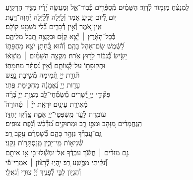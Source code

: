 \documentclass[twoside, openany, parskip=half, 11pt]{book}
\begin{document}
\begin{narrow}
לַמְנַצֵּ֗חַ מִזְמ֥וֹר לְ֯דָוִֽד׃ \hfill \break
הַשָּׁמַ֗יִם מְֽ֯סַפְּ֯רִ֥ים כְּ֯בֽוֹד־אֵ֑ל \hfill וּֽמַעֲשֵׂ֥ה יָ֝דָ֗יו מַגִּ֥יד הָרָקִֽיעַ׃ \\
י֣וֹם לְ֭֯יוֹם יַבִּ֣יעַֽ אֹ֑מֶר \hfill וְ֯לַ֥יְלָה לְּ֯֝לַ֗יְלָה יְ֯חַוֶּה־דָּֽעַת׃ \\
אֵֽין־אֹ֭מֶר וְ֯אֵ֣ין דְּ֯בָרִ֑ים \hfill בְּ֯֝לִ֗י נִשְׁמָ֥ע קוֹלָֽם׃ \\
בְּ֯כׇל־הָאָ֨רֶץ ׀ יָ֘צָ֤א קַוָּ֗ם \hfill וּבִקְצֵ֣ה תֵ֭בֵל מִלֵּיהֶ֑ם \\
לַ֝שֶּׁ֗מֶשׁ שָֽׂם־אֹ֥הֶל בָּהֶֽם׃ \hfill
וְ֯ה֗וּא כְּ֭֯חָתָן יֹצֵ֣א מֵחֻפָּת֑וֹ\\
יָשִׂ֥ישׂ כְּ֯֝גִבּ֗וֹר לָר֥וּץ אֹֽרַח׃ \hfill
מִקְצֵ֤ה הַשָּׁמַ֨יִם ׀ מֽוֹצָא֗וֹ\\ וּתְקוּפָת֥וֹ עַל־קְ֯צוֹתָ֑ם \hfill וְ֯אֵ֥ין נִ֝סְתָּ֗ר מֵחַמָּתֽוֹ׃ \\
תּ֘וֹרַ֤ת יְיָ֣ תְּ֭֯מִימָה \hfill מְ֯שִׁ֣יבַת נָ֑פֶשׁ \\
עֵד֥וּת יְיָ֥ נֶ֝אֱמָנָ֗ה \hfill מַחְכִּ֥ימַת פֶּֽתִי׃ \\
פִּקּ֘וּדֵ֤י יְיָ֣ יְ֭֯שָׁרִים מְ֯שַׂמְּ֯חֵי־לֵ֑ב \hfill מִצְוַ֥ת יְיָ֥ בָּ֝רָ֗ה\\
מְ֯אִירַ֥ת עֵינָֽיִם׃ \hfill
יִרְאַ֤ת יְיָ֨ ׀ טְ֯הוֹרָה֮ \\
עוֹמֶ֢דֶת לָ֫עַ֥ד \hfill מִֽשְׁפְּטֵי־יְיָ֥ אֱמֶ֑ת צָֽדְ֯ק֥וּ יַחְדָּֽו׃ \\
הַֽנֶּחֱמָדִ֗ים מִ֭זָּהָב וּמִפַּ֣ז רָ֑ב \hfill וּמְתוּקִ֥ים מִ֝דְּ֯בַ֗שׁ וְ֯נֹ֣פֶת צוּפִֽים׃ \\
גַּֽם־עַ֭בְדְּ֯ךָ נִזְהָ֣ר בָּהֶ֑ם \hfill בְּ֯֝שׇׁמְרָ֗ם עֵ֣קֶב רָֽב׃ \\
שְׁ֯גִיא֥וֹת מִֽי־יָבִ֑ין \hfill מִֽנִּסְתָּר֥וֹת נַקֵּֽנִי׃ \\
גַּ֤ם מִזֵּדִ֨ים ׀ חֲשֹׂ֬ךְ עַבְדֶּ֗ךָ \hfill אַֽל־יִמְשְׁ֯לוּ־בִ֣י אָ֣ז אֵיתָ֑ם \\
וְ֯֝נִקֵּ֗יתִי מִפֶּ֥שַֽׁע רָֽב׃ \hfill
יִ֥הְיֽוּ לְ֯רָצ֨וֹן ׀ אִמְרֵי־פִ֡י\\
וְ֯הֶגְי֣וֹן לִבִּ֣י לְ֯פָנֶ֑יךָ \hfill יְ֝יָ֗ צוּרִ֥י וְ֯גֹאֲלִֽי׃ \\


\enlargethispage{\baselineskip}


\end{narrow}
\end{document}
